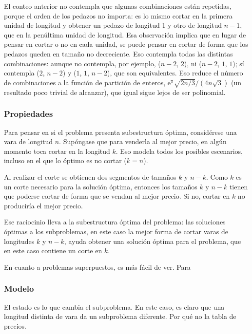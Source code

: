 El conteo anterior no contempla que algunas combinaciones están repetidas, porque el orden de los pedazos no importa: es lo mismo cortar en la primera unidad de longitud y obtener un pedazo de longitud \(1\) y otro de longitud \(n-1\), que en la penúltima unidad de longitud. Esa observación implica que en lugar de pensar en cortar o no en cada unidad, se puede pensar en cortar de forma que los pedazos queden en tamaño no decreciente. Eso contempla todas las distintas combinaciones: aunque no contempla, por ejemplo, (\(n-2\), \(2\)), ni (\(n-2\), \(1\), \(1\)); sí contempla (\(2\), \(n-2\)) y (\(1\), \(1\), \(n-2\)), que son equivalentes. Eso reduce el número de combinaciones a la función de partición de enteros, \(\mathrm{e}^\mathrm{\pi}\sqrt{2n/3}/(4n\sqrt{3})\) (un resultado poco trivial de alcanzar), que igual sigue lejos de ser polinomial.

\subsubsection{Propiedades}

Para pensar en si el problema presenta subestructura óptima, considérese una vara de longitud \(n\). Supóngase que para venderla al mejor precio, en algún momento toca cortar en la longitud \(k\). Eso modela todos los posibles escenarios, incluso en el que lo óptimo es no cortar (\(k = n\)).

Al realizar el corte se obtienen dos segmentos de tamaños \(k\) y \(n-k\). Como \(k\) es un corte necesario para la solución óptima, entonces los tamaños \(k\) y \(n-k\) tienen que poderse cortar de forma que se vendan al mejor precio. Si no, cortar en \(k\) no produciría el mejor precio.

Ese raciocinio lleva a la subestructura óptima del problema: las soluciones óptimas a los subproblemas, en este caso la mejor forma de cortar varas de longitudes \(k\) y \(n-k\), ayuda obtener una solución óptima para el problema, que en este caso contiene un corte en \(k\).

En cuanto a problemas superpuestos, es más fácil de ver. Para %

\subsubsection{Modelo}

El estado es lo que cambia el subproblema. En este caso, es claro que una longitud distinta de vara da un subproblema diferente. 
Por qué no la tabla de precios.

